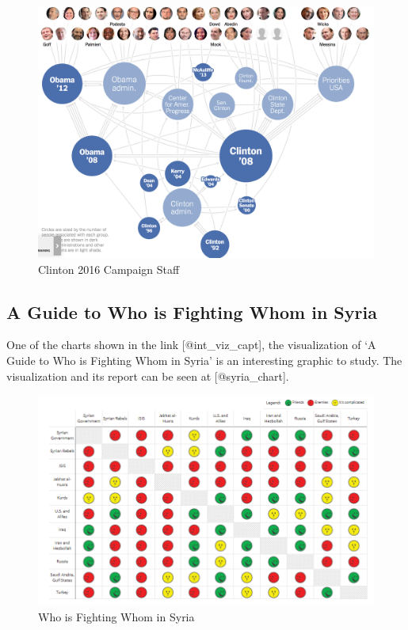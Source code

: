 \documentclass[]{book}
\theoremstyle{definition}
\theoremstyle{definition}
\theoremstyle{definition}
\theoremstyle{remark}
\begin{document}
\begin{figure}
\centering
\includegraphics{images/clinton_campaign.png}
\caption{Clinton 2016 Campaign Staff}
\end{figure}

\subsection{A Guide to Who is Fighting Whom in
Syria}\label{a-guide-to-who-is-fighting-whom-in-syria}

One of the charts shown in the link {[}@int\_viz\_capt{]}, the
visualization of `A Guide to Who is Fighting Whom in Syria' is an
interesting graphic to study. The visualization and its report can be
seen at {[}@syria\_chart{]}.

\begin{figure}
\centering
\includegraphics{images/img_syria_summary.PNG}
\caption{Who is Fighting Whom in Syria}
\end{figure}
\end{document}
